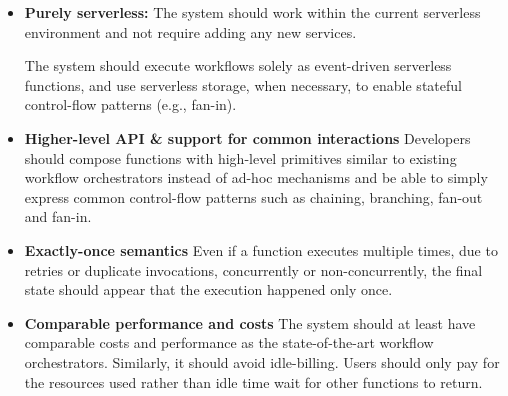 \begin{itemize}

    \item \textbf{Purely serverless: } The system should work within the
    current serverless environment and not require adding any new services.

    The system should execute workflows solely as event-driven serverless
    functions, and use serverless storage, when necessary, to enable stateful
    control-flow patterns (e.g., fan-in).

    \item \textbf{Higher-level API \& support for common interactions}
    Developers should compose functions with high-level primitives similar to
    existing workflow orchestrators instead of ad-hoc mechanisms and be able
    to simply express common control-flow patterns such as chaining,
    branching, fan-out and fan-in.

    \item \textbf{Exactly-once semantics} Even if a function executes multiple
    times, due to retries or duplicate invocations, concurrently or
    non-concurrently, the final state should appear that the execution
    happened only once.

    \item \textbf{Comparable performance and costs} The system should at least
    have comparable costs and performance as the state-of-the-art workflow
    orchestrators. Similarly, it should avoid idle-billing. Users should only pay
    for the resources used rather than idle time wait for other functions to
    return.  


\end{itemize}





